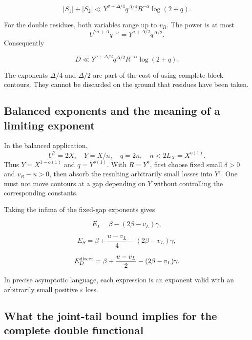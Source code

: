 \documentclass[11pt]{article}
\numberwithin{equation}{section}
\begin{document}
\begin{equation}\label{res:B12}
|S_1|+|S_2|
 \ll Y^{\sigma+\Delta/4}q^{\Delta/4}
 R^{-\alpha}\log(2+q).
\end{equation}

For the double residues, both variables range up to \(v_R\). The power
is at most \[
 U^{2\sigma+\Delta}q^{-\sigma}
 =Y^{\sigma+\Delta/2}q^{\Delta/2}.
\] Consequently

\begin{equation}\label{res:B13}
D\ll Y^{\sigma+\Delta/2}q^{\Delta/2}
 R^{-\alpha}\log(2+q).
\end{equation}

The exponents \(\Delta/4\) and \(\Delta/2\) are part of the cost of
using complete block contours. They cannot be discarded on the ground
that residues have been taken.

\subsection{Balanced exponents and the meaning of a limiting
exponent}\label{balanced-exponents-and-the-meaning-of-a-limiting-exponent}

In the balanced application, \[
 U^2=2X,\quad Y=X/n,\quad q=2n,\quad n<2L_X=X^{o(1)}.
\] Thus \(Y=X^{1-o(1)}\) and \(q=Y^{o(1)}\). With \(R=Y^\gamma\), first
choose fixed small \(\delta>0\) and \(v_R-u>0\), then absorb the
resulting arbitrarily small losses into \(Y^\varepsilon\). One must not
move contours at a gap depending on \(Y\) without controlling the
corresponding constants.

Taking the infima of the fixed-gap exponents gives

\begin{equation}\label{res:B14}
E_I=\beta-(2\beta-v_L)\gamma,
\end{equation}

\begin{equation}\label{res:B15}
E_S=\beta+\frac{u-v_L}{4}-(2\beta-v_L)\gamma,
\end{equation}

\begin{equation}\label{res:B16}
E_D^{\rm direct}
 =\beta+\frac{u-v_L}{2}-(2\beta-v_L)\gamma.
\end{equation}

In precise asymptotic language, each expression is an exponent valid
with an arbitrarily small positive \(\varepsilon\) loss.

\subsection{What the joint-tail bound implies for the complete double
functional}\label{what-the-joint-tail-bound-implies-for-the-complete-double-functional}
\end{document}
